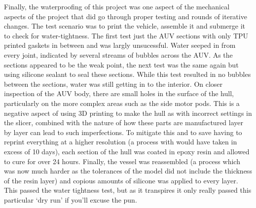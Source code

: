 \documentclass[11pt,a4paper,titlepage]{report}
\begin{document}
	Finally, the waterproofing of this project was one aspect of the mechanical aspects of the project that did go through proper testing and rounds of iterative changes. The test scenario was to print the vehicle, assemble it and submerge it to check for water-tightness. The first test just the AUV sections with only TPU printed gaskets in between and was largly unsucessful. Water seeped in from every joint, indicated by several streams of bubbles across the AUV. As the sections appeared to be the weak point, the next test was the same again but using silicone sealant to seal these sections. While this test resulted in no bubbles between the sections, water was still getting in to the interior. On closer inspection of the AUV body, there are small holes in the surface of the hull, particularly on the more complex areas such as the side motor pods. This is a negative aspect of using 3D printing to make the hull as with incorrect settings in the slicer, combined with the nature of how these parts are manufactured layer by layer can lead to such imperfections. To mitigate this and to save having to reprint everything at a higher resolution (a process with would have taken in excess of 10 days), each section of the hull was coated in epoxy resin and allowed to cure for over 24 hours. Finally, the vessel was reassembled (a process which was now much harder as the tolerances of the model did not include the thickness of the resin layer) and copious amounts of silicone was applied to every layer. This passed the water tightness test, but as it transpires it only really passed this particular `dry run' if you'll excuse the pun. 
	
\end{document}
